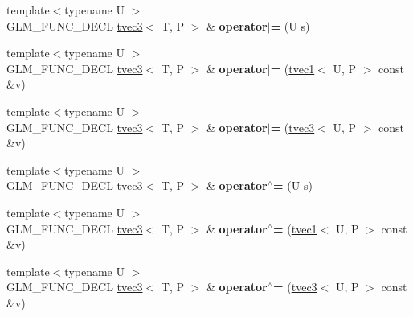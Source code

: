 \begin{DoxyCompactItemize}
\item 
\hypertarget{structglm_1_1tvec3_a86a88aaeac4fac60f2b0de6ad499d200}{{\footnotesize template$<$typename U $>$ }\\G\-L\-M\-\_\-\-F\-U\-N\-C\-\_\-\-D\-E\-C\-L \hyperlink{structglm_1_1tvec3}{tvec3}$<$ T, P $>$ \& {\bfseries operator$\vert$=} (U s)}\label{structglm_1_1tvec3_a86a88aaeac4fac60f2b0de6ad499d200}

\item 
\hypertarget{structglm_1_1tvec3_a2fe619296352d6a5298b63b3d118bbeb}{{\footnotesize template$<$typename U $>$ }\\G\-L\-M\-\_\-\-F\-U\-N\-C\-\_\-\-D\-E\-C\-L \hyperlink{structglm_1_1tvec3}{tvec3}$<$ T, P $>$ \& {\bfseries operator$\vert$=} (\hyperlink{structglm_1_1tvec1}{tvec1}$<$ U, P $>$ const \&v)}\label{structglm_1_1tvec3_a2fe619296352d6a5298b63b3d118bbeb}

\item 
\hypertarget{structglm_1_1tvec3_a81a873ab5ca19d6bf3360a11f65d4f50}{{\footnotesize template$<$typename U $>$ }\\G\-L\-M\-\_\-\-F\-U\-N\-C\-\_\-\-D\-E\-C\-L \hyperlink{structglm_1_1tvec3}{tvec3}$<$ T, P $>$ \& {\bfseries operator$\vert$=} (\hyperlink{structglm_1_1tvec3}{tvec3}$<$ U, P $>$ const \&v)}\label{structglm_1_1tvec3_a81a873ab5ca19d6bf3360a11f65d4f50}

\item 
\hypertarget{structglm_1_1tvec3_a2997272bad29b52005daaaf94d60c7b0}{{\footnotesize template$<$typename U $>$ }\\G\-L\-M\-\_\-\-F\-U\-N\-C\-\_\-\-D\-E\-C\-L \hyperlink{structglm_1_1tvec3}{tvec3}$<$ T, P $>$ \& {\bfseries operator$^\wedge$=} (U s)}\label{structglm_1_1tvec3_a2997272bad29b52005daaaf94d60c7b0}

\item 
\hypertarget{structglm_1_1tvec3_a5dd85e96e456dee71a1e62bfed87aaf5}{{\footnotesize template$<$typename U $>$ }\\G\-L\-M\-\_\-\-F\-U\-N\-C\-\_\-\-D\-E\-C\-L \hyperlink{structglm_1_1tvec3}{tvec3}$<$ T, P $>$ \& {\bfseries operator$^\wedge$=} (\hyperlink{structglm_1_1tvec1}{tvec1}$<$ U, P $>$ const \&v)}\label{structglm_1_1tvec3_a5dd85e96e456dee71a1e62bfed87aaf5}

\item 
\hypertarget{structglm_1_1tvec3_a31247f55bc34542e94c0928ad1c1e5e5}{{\footnotesize template$<$typename U $>$ }\\G\-L\-M\-\_\-\-F\-U\-N\-C\-\_\-\-D\-E\-C\-L \hyperlink{structglm_1_1tvec3}{tvec3}$<$ T, P $>$ \& {\bfseries operator$^\wedge$=} (\hyperlink{structglm_1_1tvec3}{tvec3}$<$ U, P $>$ const \&v)}\label{structglm_1_1tvec3_a31247f55bc34542e94c0928ad1c1e5e5}


\end{DoxyCompactItemize}
